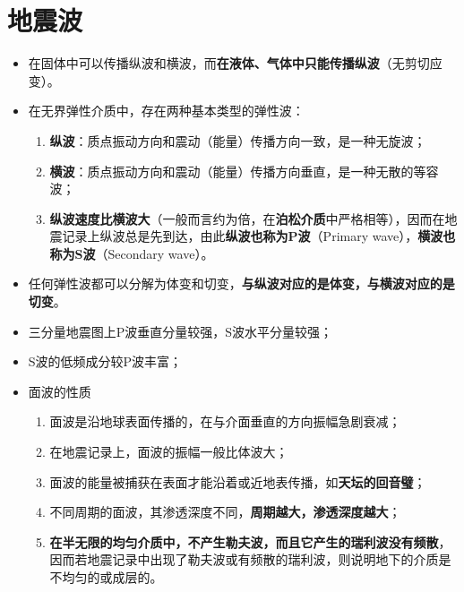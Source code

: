 \documentclass[twoside,titlepage,hyperref,UTF8,12pt]{ctexart}
\begin{document}
\section{地震波}
\begin{itemize}
    \item 在固体中可以传播纵波和横波，而\textbf{在液体、气体中只能传播纵波}（无剪切应变）。
    \item 在无界弹性介质中，存在两种基本类型的弹性波：
        \begin{enumerate}
            \item \textbf{纵波}：质点振动方向和震动（能量）传播方向一致，是一种无旋波；
            \item \textbf{横波}：质点振动方向和震动（能量）传播方向垂直，是一种无散的等容波；
            \item \textbf{纵波速度比横波大}（一般而言约为倍，在\textbf{泊松介质}中严格相等），因而在地震记录上纵波总是先到达，由此\textbf{纵波也称为P波}（Primary wave），\textbf{横波也称为S波}（Secondary wave）。
        \end{enumerate}
    \item 任何弹性波都可以分解为体变和切变，\textbf{与纵波对应的是体变，与横波对应的是切变}。
    \item 三分量地震图上P波垂直分量较强，S波水平分量较强；
    \item S波的低频成分较P波丰富；
    \item 面波的性质
        \begin{enumerate}
            \item 面波是沿地球表面传播的，在与介面垂直的方向振幅急剧衰减；
            \item 在地震记录上，面波的振幅一般比体波大；
            \item 面波的能量被捕获在表面才能沿着或近地表传播，如\textbf{天坛的回音璧}；
            \item 不同周期的面波，其渗透深度不同，\textbf{周期越大，渗透深度越大}；
            \item \textbf{在半无限的均匀介质中，不产生勒夫波，而且它产生的瑞利波没有频散}，因而若地震记录中出现了勒夫波或有频散的瑞利波，则说明地下的介质是不均匀的或成层的。
        \end{enumerate}
\end{itemize}
\end{document}
